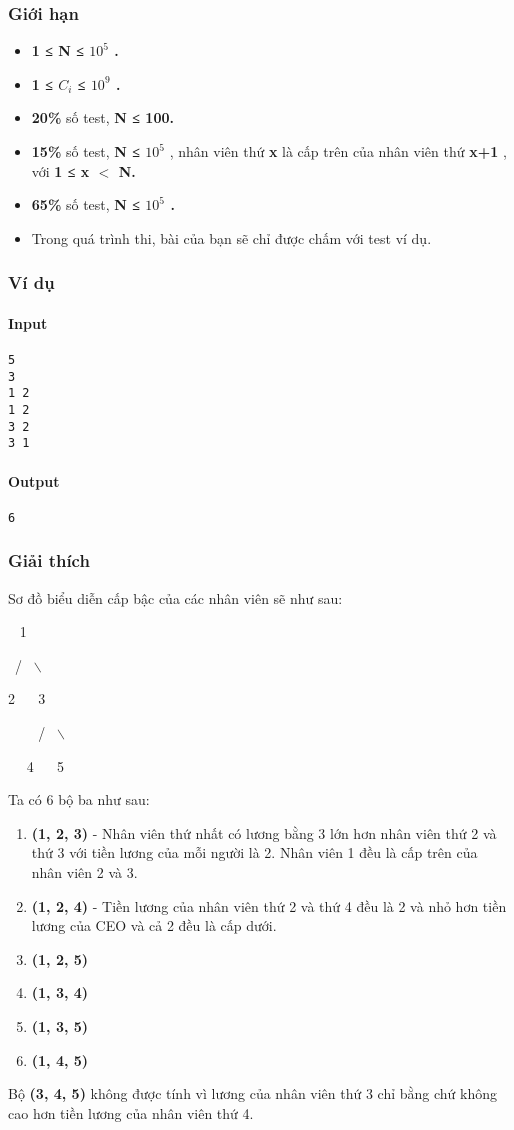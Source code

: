 \subsubsection{Giới hạn}
\begin{itemize}
	\item \textbf{1 ≤ N ≤ $10^{5}$ . }
	\item \textbf{1 ≤ $C_{i}$ ≤ $10^{9}$ . }
	\item \textbf{20\% } số test, \textbf{ N ≤ 100. }
	\item \textbf{15\% } số test, \textbf{ N ≤ $10^{5}$} , nhân viên thứ \textbf{ x } là cấp trên của nhân viên thứ \textbf{ x+1 } , với \textbf{ 1 ≤ x $<$ N. }
	\item \textbf{65\% } số test, \textbf{ N ≤ $10^{5}$ . }
	\item Trong quá trình thi, bài của bạn sẽ chỉ được chấm với test ví dụ.
\end{itemize}

\subsubsection{Ví dụ}

\paragraph{Input}
\begin{verbatim}
5
3
1 2
1 2
3 2
3 1\end{verbatim}

\paragraph{Output}
\begin{verbatim}
6\end{verbatim}

\subsubsection{Giải thích}

Sơ đồ biểu diễn cấp bậc của các nhân viên sẽ như sau:

  1


 /  $\backslash$


2    3


     /  $\backslash$


   4    5

Ta có 6 bộ ba như sau:
\begin{enumerate}
	\item \textbf{(1, 2, 3) } - Nhân viên thứ nhất có lương bằng 3 lớn hơn nhân viên thứ 2 và thứ 3 với tiền lương của mỗi người là 2. Nhân viên 1 đều là cấp trên của nhân viên 2 và 3.
	\item \textbf{(1, 2, 4) } - Tiền lương của nhân viên thứ 2 và thứ 4 đều là 2 và nhỏ hơn tiền lương của CEO và cả 2 đều là cấp dưới.
	\item \textbf{(1, 2, 5) }
	\item \textbf{(1, 3, 4) }
	\item \textbf{(1, 3, 5) }
	\item \textbf{(1, 4, 5) }
\end{enumerate}

Bộ \textbf{ (3, 4, 5) } không được tính vì lương của nhân viên thứ 3 chỉ bằng chứ không cao hơn tiền lương của nhân viên thứ 4.
